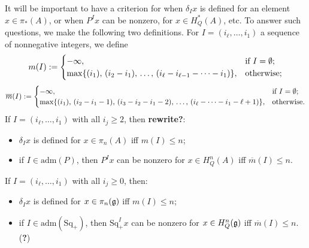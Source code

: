 \documentclass[10pt]{article}
\newcommand{\admis}[1]{\mathrm{adm}(#1)}%
\newcommand{\SqShift}{\Sq_{+}}
\newcommand{\Sq}{\mathrm{Sq}}
\newcommand{\minDim}{m}
\newcommand{\minDimP}{\overline{m}}
\begin{document}
\begin{SteenrodAlgebrasAndTheirKoszulDuals}
It will be important to have a criterion for when $\delta_Ix$ is defined for an element $x\in\pi_*(A)$, or when $P^Ix$ can be nonzero, for $x\in H^*_Q(A)$, etc.
To answer such questions, we make the following two definitions. For $I=(i_\ell,\ldots,i_1)$ a sequence of nonnegative integers, we define
\[\minDim(I):=\begin{cases}
-\infty,&\textup{if }I=\emptyset;\\
\max\{(i_1),\,(i_2-i_1),\,\ldots,\,(i_{\ell}-i_{\ell-1}-\cdots -i_1)\},&\textup{otherwise};
\end{cases}
\]
\[\minDimP(I):=\begin{cases}
-\infty,&\textup{if }I=\emptyset;\\
\max\{(i_1),\,(i_2-i_1-1),\,(i_3-i_2-i_1-2),\,\ldots,\,(i_{\ell}-\cdots-i_1-\ell+1)\},&\textup{otherwise}.
\end{cases}
\]
If $I=(i_{\ell},\ldots,i_1)$ with all $i_j\geq2$, then \textbf{rewrite?}:
\begin{itemize}
\setlength{\parindent}{.25in}
\squishlist
\item $\delta_Ix$ is defined for $x\in \pi_n(A)$ iff $\minDim(I)\leq n$;
\item if $I\in\admis{P}$, then $P^Ix$ can be nonzero for $x\in H^n_Q(A)$ iff $\minDimP(I)\leq n$.
\end{itemize}
If $I=(i_{\ell},\ldots,i_1)$ with all $i_j\geq0$, then:
\begin{itemize}
\setlength{\parindent}{.25in}
\squishlist
\item $\delta_Ix$ is defined for $x\in \pi_n(\mathfrak{g})$ iff $\minDim(I)\leq n$;
\item if $I\in\admis{\SqShift}$, then $\SqShift^Ix$ can be nonzero for $x\in H^n_Q(\mathfrak{g})$ iff $\minDimP(I)\leq n$. (\textbf{?})
\end{itemize}


\end{SteenrodAlgebrasAndTheirKoszulDuals}
\end{document}
